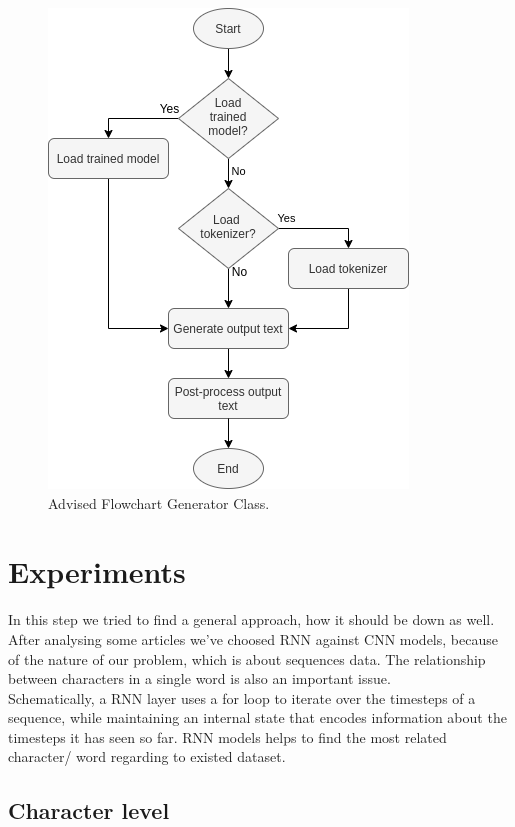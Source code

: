 \documentclass[conference]{IEEEtran}
\begin{document}
\begin{figure}[htbp]
\centerline{\includegraphics[scale=0.65]{pictures/flowchart_generator.png}}
\caption{Advised Flowchart Generator Class.}
\label{fig:flowchart_generator}
\end{figure}

\section{Experiments}

In this step we tried to find a general approach, how it should be down as well. After analysing some articles we’ve choosed RNN against CNN models, because of the nature of our problem, which is about sequences data. The relationship between characters in a single word is also an important issue.\\
Schematically, a RNN layer uses a for loop to iterate over the timesteps of a sequence, while maintaining an internal state that encodes information about the timesteps it has seen so far. RNN models helps to find the most related character/ word regarding to existed dataset.

\subsection{Character level}\label{subsec_character_level}
\end{document}
